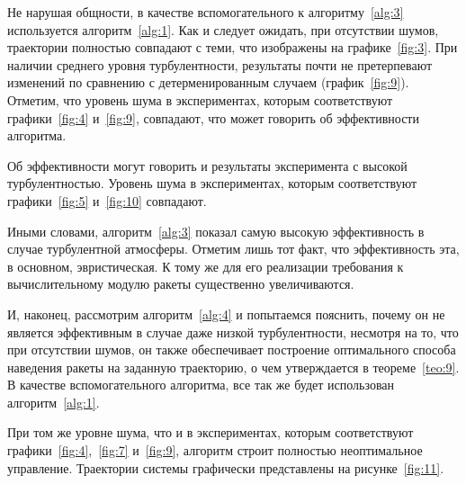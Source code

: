 Не нарушая общности, в качестве вспомогательного к алгоритму~\ref{alg:3} используется алгоритм~\ref{alg:1}. Как и следует ожидать, при отсутствии шумов, траектории полностью совпадают с теми, что изображены на графике~\vref{fig:3}. При наличии среднего уровня турбулентности, результаты почти не претерпевают изменений по сравнению с детерменированным случаем (график~\ref{fig:9}). Отметим, что уровень шума в экспериментах, которым соответствуют графики~\vref{fig:4} и~\ref{fig:9}, совпадают, что может говорить об эффективности алгоритма.


Об эффективности могут говорить и результаты эксперимента с высокой турбулентностью. Уровень шума в экспериментах, которым соответствуют графики~\vref{fig:5} и~\ref{fig:10} совпадают.


Иными словами, алгоритм~\ref{alg:3} показал самую высокую эффективность в случае турбулентной атмосферы. Отметим лишь тот факт, что эффективность эта, в основном, эвристическая. К тому же для его реализации требования к вычислительному модулю ракеты существенно увеличиваются.

\br

И, наконец, рассмотрим алгоритм~\ref{alg:4} и попытаемся пояснить, почему он не является эффективным в случае даже низкой турбулентности, несмотря на то, что при отсутствии шумов, он также обеспечивает построение оптимального способа наведения ракеты на заданную траекторию, о чем утверждается в теореме~\vref{teo:9}. В качестве вспомогательного алгоритма, все так же будет использован алгоритм~\ref{alg:1}.

При том же уровне шума, что и в экспериментах, которым соответствуют графики~\ref{fig:4},~\vref{fig:7} и~\ref{fig:9}, алгоритм строит полностью неоптимальное управление. Траектории системы графически представлены на рисунке~\ref{fig:11}.


